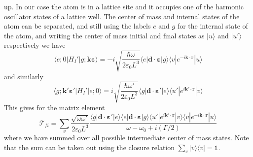 \documentclass[11pt,letter]{article}
\newcommand{\bv}[1]{\ensuremath{\bm{#1}}}
\begin{document}
up.  In our case the atom is in a lattice site and it occupies one of the
harmonic oscillator states of a lattice well.   The center of mass and internal
states of the atom can be separated,   and still using the labels $e$ and $g$
for the internal state of the atom, and writing the center of mass initial and final states as $| u \rangle$ and $|u'\rangle$ respectively we have
\begin{equation}
   \langle e; 0 | H_{I}' | g; \bv{k}\bv{\varepsilon} \rangle = 
       -i \sqrt{ \frac{ \hbar \omega }{2 \varepsilon_{0} L^{3} }} 
      \langle e | \bv{d} \cdot \bv{\varepsilon} | g \rangle 
      \langle v | e^{-i\bv{k}\cdot\bv{r}} | u \rangle
\end{equation}
and similarly
\begin{equation}
   \langle g; \bv{k}'\bv{\varepsilon}' | H_{I}' | e; 0\rangle = 
       i \sqrt{ \frac{ \hbar \omega' }{2 \varepsilon_{0} L^{3} }} 
      \langle g | \bv{d} \cdot \bv{\varepsilon}' | e \rangle 
      \langle u' | e^{i\bv{k}'\cdot\bv{r}} | v \rangle
\end{equation}
This gives for the matrix element
\begin{equation}
    \mathcal{T}_{fi} = \sum_{v} \frac{\sqrt{\omega \omega'}}{2\varepsilon_{0} L^{3}}
    \frac{ 
      \langle g | \bv{d} \cdot \bv{\varepsilon}' | e \rangle 
      \langle e | \bv{d} \cdot \bv{\varepsilon} | g \rangle 
      \langle u'| e^{i\bv{k}'\cdot\bv{r}} | v \rangle 
      \langle v | e^{-i\bv{k}\cdot\bv{r}} | u  \rangle
       }
        { \omega - \omega_{0} + i (\Gamma/2 ) }
\end{equation}
where we have summed over all possible intermediate center of mass states.  Note that the sum can be taken out using the closure relation $\sum_{v}|v\rangle\langle v| = \mathbb{1}$. 
\end{document}
